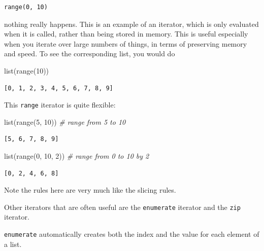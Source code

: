 \documentclass[
  letterpaper,
]{scrbook}
\newenvironment{Shaded}{\begin{snugshade}}{\end{snugshade}}
\newcommand{\BuiltInTok}[1]{#1}
\newcommand{\CommentTok}[1]{\textcolor[rgb]{0.56,0.35,0.01}{\textit{#1}}}
\newcommand{\DecValTok}[1]{\textcolor[rgb]{0.00,0.00,0.81}{#1}}
\newcommand{\NormalTok}[1]{#1}
\begin{document}
\begin{verbatim}
range(0, 10)
\end{verbatim}

nothing really happens. This is an example of an iterator, which is only evaluated when it is called, rather than being stored in memory. This is useful especially when you iterate over large numbers of things, in terms of preserving memory and speed. To see the corresponding list, you would do

\begin{Shaded}
\begin{Highlighting}[]
\BuiltInTok{list}\NormalTok{(}\BuiltInTok{range}\NormalTok{(}\DecValTok{10}\NormalTok{))}
\end{Highlighting}
\end{Shaded}

\begin{verbatim}
[0, 1, 2, 3, 4, 5, 6, 7, 8, 9]
\end{verbatim}

This \texttt{range} iterator is quite flexible:

\begin{Shaded}
\begin{Highlighting}[]
\BuiltInTok{list}\NormalTok{(}\BuiltInTok{range}\NormalTok{(}\DecValTok{5}\NormalTok{, }\DecValTok{10}\NormalTok{))  }\CommentTok{# range from 5 to 10}
\end{Highlighting}
\end{Shaded}

\begin{verbatim}
[5, 6, 7, 8, 9]
\end{verbatim}

\begin{Shaded}
\begin{Highlighting}[]
\BuiltInTok{list}\NormalTok{(}\BuiltInTok{range}\NormalTok{(}\DecValTok{0}\NormalTok{, }\DecValTok{10}\NormalTok{, }\DecValTok{2}\NormalTok{))  }\CommentTok{# range from 0 to 10 by 2}
\end{Highlighting}
\end{Shaded}

\begin{verbatim}
[0, 2, 4, 6, 8]
\end{verbatim}

Note the rules here are very much like the slicing rules.

Other iterators that are often useful are the \texttt{enumerate} iterator and the \texttt{zip} iterator.

\texttt{enumerate} automatically creates both the index and the value for each element of a list.
\end{document}
